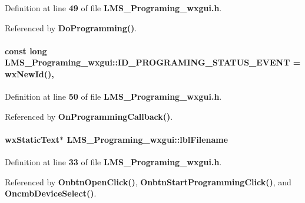 Definition at line {\bf 49} of file {\bf L\+M\+S\+\_\+\+Programing\+\_\+wxgui.\+h}.



Referenced by {\bf Do\+Programming()}.

\paragraph[{I\+D\+\_\+\+P\+R\+O\+G\+R\+A\+M\+I\+N\+G\+\_\+\+S\+T\+A\+T\+U\+S\+\_\+\+E\+V\+E\+NT}]{\setlength{\rightskip}{0pt plus 5cm}const long L\+M\+S\+\_\+\+Programing\+\_\+wxgui\+::\+I\+D\+\_\+\+P\+R\+O\+G\+R\+A\+M\+I\+N\+G\+\_\+\+S\+T\+A\+T\+U\+S\+\_\+\+E\+V\+E\+NT = wx\+New\+Id()\hspace{0.3cm}{\ttfamily [static]}, {\ttfamily [protected]}}\label{classLMS__Programing__wxgui_ac14b013a38d67e65ec15d7bf7a61f0bb}


Definition at line {\bf 50} of file {\bf L\+M\+S\+\_\+\+Programing\+\_\+wxgui.\+h}.



Referenced by {\bf On\+Programming\+Callback()}.

\paragraph[{lbl\+Filename}]{\setlength{\rightskip}{0pt plus 5cm}wx\+Static\+Text$\ast$ L\+M\+S\+\_\+\+Programing\+\_\+wxgui\+::lbl\+Filename\hspace{0.3cm}{\ttfamily [protected]}}\label{classLMS__Programing__wxgui_a91d454bebcbb65b5f1d3a153aa65a3cf}


Definition at line {\bf 33} of file {\bf L\+M\+S\+\_\+\+Programing\+\_\+wxgui.\+h}.



Referenced by {\bf Onbtn\+Open\+Click()}, {\bf Onbtn\+Start\+Programming\+Click()}, and {\bf Oncmb\+Device\+Select()}.

